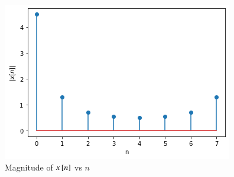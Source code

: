 \documentclass[journal,12pt,twocolumn]{IEEEtran}
\begin{document}
\begin{figure}[!ht]
    \centering
    \includegraphics[width=\columnwidth] {fig.png}
    \caption{Magnitude of $x{}\left[n\right]$ vs $n$}
\end{figure}
\end{document}
